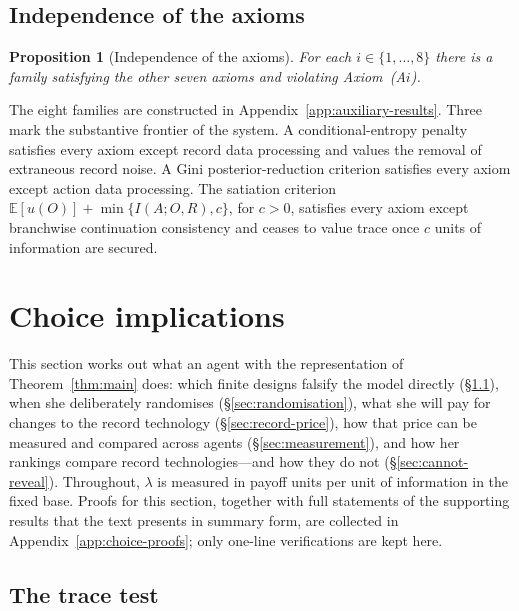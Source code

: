 \documentclass[11pt,a4paper]{article}
\newtheorem{proposition}[theorem]{Proposition}
\theoremstyle{definition}
\newcommand{\E}{\mathbb E}
\newcommand{\1}{\mathbf 1}
\begin{document}
\subsection{Independence of the axioms}

\begin{proposition}[Independence of the axioms]\label{prop:independence}
For each $i\in\{1,\ldots,8\}$ there is a family satisfying the other seven axioms and violating
Axiom~\textup{(A$i$)}.
\end{proposition}

The eight families are constructed in Appendix~\ref{app:auxiliary-results}.  Three mark the substantive frontier of the
system.  A conditional-entropy penalty satisfies every axiom except record data processing and values the removal of
extraneous record noise.  A Gini posterior-reduction criterion satisfies every axiom except action data processing.
The satiation criterion $\E[u(O)]+\min\{I(A;O,R),c\}$, for $c>0$, satisfies every axiom except branchwise
continuation consistency and ceases to value trace once $c$ units of information are secured.

\section{Choice implications}\label{sec:implications}

This section works out what an agent with the representation of Theorem~\ref{thm:main} does: which finite designs
falsify the model directly (\S\ref{sec:tracetest}), when she deliberately randomises (\S\ref{sec:randomisation}),
what she will pay for changes to the record technology (\S\ref{sec:record-price}), how that price can be
measured and compared across agents (\S\ref{sec:measurement}), and how her rankings compare record
technologies---and how they do not (\S\ref{sec:cannot-reveal}).
Throughout, $\lambda$ is measured in payoff units per unit of information in the fixed base.  Proofs for this
section, together with full statements of the supporting results that the text presents in summary form, are
collected in Appendix~\ref{app:choice-proofs}; only one-line verifications are kept here.

\subsection{The trace test}\label{sec:tracetest}
\end{document}
